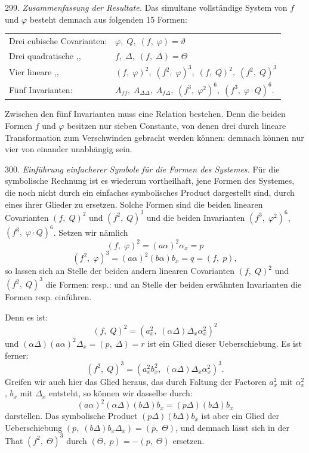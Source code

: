299. \textit{Zusammenfassung der Resultate.} Das simultane vollständige System von $f$ und $\varphi$ besteht demnach aus folgenden 15 Formen:


\begin{tabular}{@{}ll@{}}
Drei cubische Covarianten: & $\varphi, \; Q, \; (f, \; \varphi) = \vartheta$ \\
Drei quadratische \quad ,, & $f, \; \Delta, \; (f, \; \Delta) = \Theta$ \\
Vier lineare \quad ,, & $(f, \; \varphi)^2, \; (f^2, \; \varphi)^3, \; (f, \; Q)^2, \; (f^2, \; Q)^3$ \\
Fünf Invarianten: & $A_{ff}, \; A_{\Delta\Delta}, \; A_{f\Delta}, \; (f^3, \; \varphi^2)^6, \; (f^3, \; \varphi \cdot Q)^6.$ \\
\end{tabular}

Zwischen den fünf Invarianten muss eine Relation bestehen. Denn die beiden Formen $f$ und $\varphi$ besitzen nur sieben Constante, von denen drei durch lineare Transformation zum Verschwinden gebracht werden können: demnach können nur vier von einander unabhängig sein.

300. \textit{Einführung einfacherer Symbole für die Formen des Systemes.} Für die symbolische Rechnung ist es wiederum vortheilhaft, jene Formen des Systemes, die noch nicht durch ein einfaches symbolisches Product dargestellt sind, durch eines ihrer Glieder zu ersetzen. Solche Formen sind die beiden linearen Covarianten $(f, \; Q)^2$ und $(f^2, \; Q)^3$ und die beiden Invarianten $(f^3, \; \varphi^2)^6$, $(f^3, \; \varphi \cdot Q)^6$. Setzen wir nämlich
\[
(f, \; \varphi)^2 = (a\alpha)^2 \alpha_x = p
\]
\[
(f^2, \; \varphi)^3 = (a\alpha)^2 (b\alpha) b_x = q = (f, \; p),
\]
so lassen sich an Stelle der beiden andern linearen Covarianten $(f, \; Q)^2$ und $(f^2, \; Q)^3$ die Formen:
resp.:
und an Stelle der beiden erwähnten Invarianten die Formen
resp.
einführen.

Denn es ist:
\[
(f, \; Q)^2 = (a_x^2, \; (\alpha\Delta)\Delta_x \alpha_x^2)^2
\]
und $(\alpha\Delta)(a\alpha)^2\Delta_x = (p, \; \Delta) = r$ ist ein Glied dieser Ueberschiebung. Es ist ferner:
\[
(f^2, \; Q)^3 = (a_x^2 b_x^2, \; (\alpha\Delta)\Delta_x \alpha_x^2)^3.
\]
Greifen wir auch hier das Glied heraus, das durch Faltung der Factoren $a_x^2$ mit $\alpha_x^2$, $b_x$ mit $\Delta_x$ entsteht, so können wir dasselbe durch:
\[
(a\alpha)^2(\alpha\Delta)(b\Delta)b_x = (p\Delta)(b\Delta)b_x
\]
darstellen. Das symbolische Product $(p\Delta)(b\Delta)b_x$ ist aber ein Glied der Ueberschiebung $(p, \; (b\Delta)b_x\Delta_x) = (p, \; \Theta)$, und demnach lässt sich in der That $(f^2, \; \Theta)^3$ durch $(\Theta, \; p) = -(p, \; \Theta)$ ersetzen.


